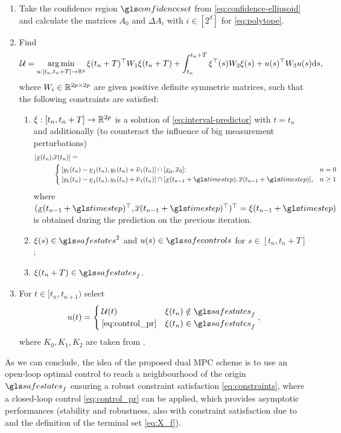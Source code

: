 \begin{enumerate}
	\item Take the confidence region $\confidenceset$ from \eqref{eq:confidence-ellipsoid} and calculate the matrices $A_{0}$ and $\Delta A_{i}$ with $i\in[2^d]$ for \eqref{eq:polytope}.
	\item Find
	\begin{equation}
	\label{eq:OCP}
	\mathcal{U}=\operatorname*{arg\,min}_{u:[t_{n},t_{n}+T]\to\mathbb{R}^{q}}\xi(t_{n}+T)^{\top}W_{1}\xi(t_{n}+T)
	+\int_{t_{n}}^{t_{n}+T}\xi^{\top}(s)W_{2}\xi(s)+u(s)^{\top}W_{3}u(s)\mathrm{d} s, 
	\end{equation}
	where $W_{i}\in\mathbb{R}^{2p\times2p}$ are given positive definite symmetric
	matrices, such that the following constraints are satisfied: 
	\begin{enumerate}
		\item $\xi:[t_{n},t_{n}+T]\to\mathbb{R}^{2p}$ is a solution of \eqref{eq:interval-predictor}
		with $t=t_{n}$ and additionally (to counteract the influence of big
		measurement perturbations)
		\begin{align}
		\label{eq:update}
		[\underline{x}(t_{n}),&\overline{x}(t_{n})]=\\
		&\begin{cases}
		[y_{1}(t_{n})-\underline{\nu}_{1}(t_{n}),y_{1}(t_{n})+\overline{\nu}_{1}(t_{n})] \cap[\underline{x}_{0},\overline{x}_{0}]; & n=0\\
		[y_{1}(t_{n})-\underline{\nu}_{1}(t_{n}),y_{1}(t_{n})+\overline{\nu}_{1}(t_{n})] \cap[\underline{x}(t_{n-1}+\timestep),\overline{x}(t_{n-1}+\timestep)], & n\geq1\\
		\end{cases}\nonumber
		\end{align}
		where $(\underline{x}(t_{n-1}+\timestep)^{\top},\overline{x}(t_{n-1}+\timestep)^{\top})^{\top}=\xi(t_{n-1}+\timestep)$
		is obtained during the prediction on the previous iteration.
		\item $\xi(s)\in\safestates^{2}$ and $u(s)\in\safecontrols$ for $s\in[t_{n},t_{n}+T]$; 
		\item $\xi(t_{n}+T)\in\safestates_{f}$.
	\end{enumerate}
	\item For $t\in[t_{n},t_{n+1})$ select
	\begin{equation}
	u(t)=\begin{cases}
	\cU(t) & \xi(t_{n})\notin\safestates_{f}\\
	\eqref{eq:control_pr} & \xi(t_{n})\in\safestates_{f}
	\end{cases},\label{eq:control}
	\end{equation}
	where $K_{0},K_{1},K_{2}$ are taken from .
\end{enumerate}
As we can conclude, the idea of the proposed dual \gls{MPC} scheme \citep[see also][]{Michalska1993,Mayne2000,Mayne2009} is to use an open-loop optimal control to reach a neighbourhood of the origin $\safestates_{f}$ ensuring a robust constraint satisfaction \eqref{eq:constraints}, where a closed-loop control \eqref{eq:control_pr} can be applied, which provides asymptotic performances (stability and robustness, also with constraint satisfaction due to  and the definition of the terminal set \eqref{eq:X_f}). 

